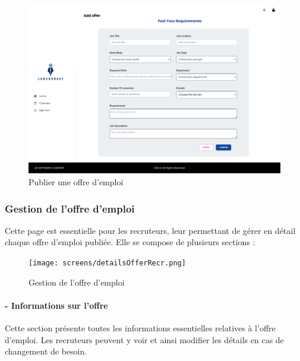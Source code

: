 \begin{figure}[htbp]
   \centering
   \includegraphics[scale=0.15]{screens/addOffer.png} 
   \caption{Publier une offre d'emploi}
   \label{fig:addOfferFields}
\end{figure}

\subsubsection{Gestion de l'offre d'emploi}
Cette page est essentielle pour les recruteurs, leur permettant de gérer en détail chaque offre d'emploi publiée. Elle se compose de plusieurs sections :
\begin{figure}[htbp]
   \centering
   \texttt{[image: screens/detailsOfferRecr.png]}
   \caption{Gestion de l'offre d'emploi}
   \label{fig:listOffers}
\end{figure}

\paragraph*{- Informations sur l'offre}
Cette section présente toutes les informations essentielles 
relatives à l'offre d'emploi. Les recruteurs peuvent y voir et 
ainsi modifier les détails en cas de changement de besoin. 

